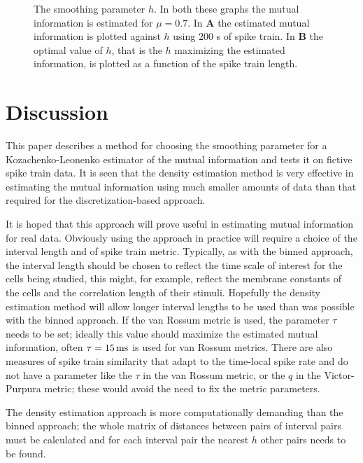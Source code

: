 \documentclass[12pt]{article}
\newcommand{\ms}{\mbox{\,ms}}
\begin{document}
\begin{figure}[tp]
\begin{center}
\begin{picture}
  \end{picture}%
\endgroup
\end{center}
\caption{The smoothing parameter $h$. In both these graphs the mutual
  information is estimated for $\mu=0.7$. In \textbf{A} the estimated
  mutual information is plotted against $h$ using 200 s of spike
  train.  In \textbf{B} the optimal value of $h$, that is the $h$
  maximizing the estimated information, is plotted as a function of
  the spike train length.
 \label{fig_h}}
\end{figure}



\section{Discussion}

This paper describes a method for choosing the smoothing parameter for
a Kozachenko-Leonenko estimator of the mutual information and tests it
on fictive spike train data. It is seen that the density estimation
method is very effective in estimating the mutual information using
much smaller amounts of data than that required for the
discretization-based approach. 

It is hoped that this approach will prove useful in estimating mutual
information for real data. Obviously using the approach in practice
will require a choice of the interval length and of spike train
metric. Typically, as with the binned approach, the interval length
should be chosen to reflect the time scale of interest for the cells
being studied, this might, for example, reflect the membrane constants
of the cells and the correlation length of their stimuli. Hopefully
the density estimation method will allow longer interval lengths to be
used than was possible with the binned approach. If the van Rossum
metric is used, the parameter $\tau$ needs to be set; ideally this
value should maximize the estimated mutual information, often
$\tau=15\ms$ is used for van Rossum metrics. There are also measures
of spike train similarity \cite{KreuzEtAl2007,KreuzEtAl2012} that
adapt to the time-local spike rate and do not have a parameter like
the $\tau$ in the van Rossum metric, or the $q$ in the Victor-Purpura
metric; these would avoid the need to fix the metric parameters.

The density estimation approach is more computationally demanding than
the binned approach; the whole matrix of distances between pairs of
interval pairs must be calculated and for each interval pair the
nearest $h$ other pairs needs to be found.
\end{document}
